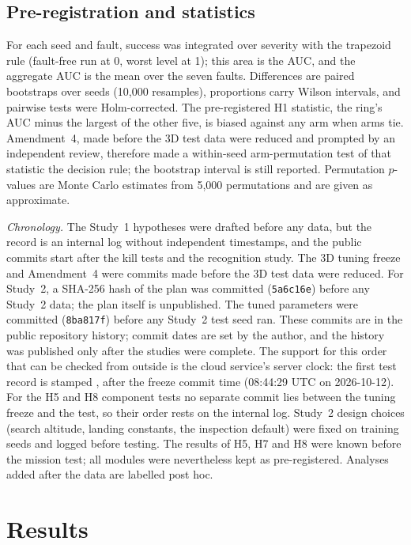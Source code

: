 \documentclass[10pt,twocolumn]{article}
\begin{document}
\subsection{Pre-registration and statistics}
For each seed and fault, success was integrated over severity with the trapezoid rule (fault-free run at 0, worst level at 1); this area is the AUC, and the aggregate AUC is the mean over the seven faults. Differences are paired bootstraps over seeds (10,000 resamples), proportions carry Wilson intervals, and pairwise tests were Holm-corrected. The pre-registered H1 statistic, the ring's AUC minus the largest of the other five, is biased against any arm when arms tie. Amendment~4, made before the 3D test data were reduced and prompted by an independent review, therefore made a within-seed arm-permutation test of that statistic the decision rule; the bootstrap interval is still reported. Permutation $p$-values are Monte Carlo estimates from 5,000 permutations and are given as approximate.

\emph{Chronology.} The Study~1 hypotheses were drafted before any data, but the record is an internal log without independent timestamps, and the public commits start after the kill tests and the recognition study. The 3D tuning freeze and Amendment~4 were commits made before the 3D test data were reduced. For Study~2, a SHA-256 hash of the plan was committed (\texttt{5a6c16e}) before any Study~2 data; the plan itself is unpublished. The tuned parameters were committed (\texttt{8ba817f}) before any Study~2 test seed ran. These commits are in the public repository history; commit dates are set by the author, and the history was published only after the studies were complete. The support for this order that can be checked from outside is the cloud service's server clock: the first test record is stamped \StwoFirstRow, after the freeze commit time (08:44:29 UTC on 2026-10-12). For the H5 and H8 component tests no separate commit lies between the tuning freeze and the test, so their order rests on the internal log. Study~2 design choices (search altitude, landing constants, the inspection default) were fixed on training seeds and logged before testing. The results of H5, H7 and H8 were known before the mission test; all modules were nevertheless kept as pre-registered. Analyses added after the data are labelled post hoc.

\section{Results}
\end{document}
